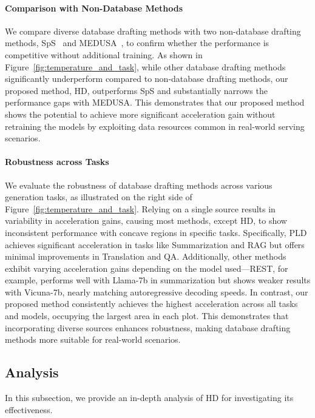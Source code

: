 \paragraph{Comparison with Non-Database Methods} 
We compare diverse database drafting methods with two non-database drafting methods, SpS~\cite{SpS} and MEDUSA~\cite{MEDUSA}, to confirm whether the performance is competitive without additional training. 
As shown in Figure~\ref{fig:temperature_and_task}, while other database drafting methods significantly underperform compared to non-database drafting methods, our proposed method, HD, outperforms SpS and substantially narrows the performance gaps with MEDUSA. 
This demonstrates that our proposed method shows the potential to achieve more significant acceleration gain without retraining the models by exploiting data resources common in real-world serving scenarios.

\paragraph{Robustness across Tasks} 
We evaluate the robustness of database drafting methods across various generation tasks, as illustrated on the right side of Figure~\ref{fig:temperature_and_task}. 
Relying on a single source results in variability in acceleration gains, causing most methods, except HD, to show inconsistent performance with concave regions in specific tasks. 
Specifically, PLD achieves significant acceleration in tasks like Summarization and RAG but offers minimal improvements in Translation and QA. 
Additionally, other methods exhibit varying acceleration gains depending on the model used—REST, for example, performs well with Llama-7b in summarization but shows weaker results with Vicuna-7b, nearly matching autoregressive decoding speeds. 
In contrast, our proposed method consistently achieves the highest acceleration across all tasks and models, occupying the largest area in each plot. This demonstrates that incorporating diverse sources enhances robustness, making database drafting methods more suitable for real-world scenarios.


\subsection{Analysis}

In this subsection, we provide an in-depth analysis of HD for investigating its effectiveness.

